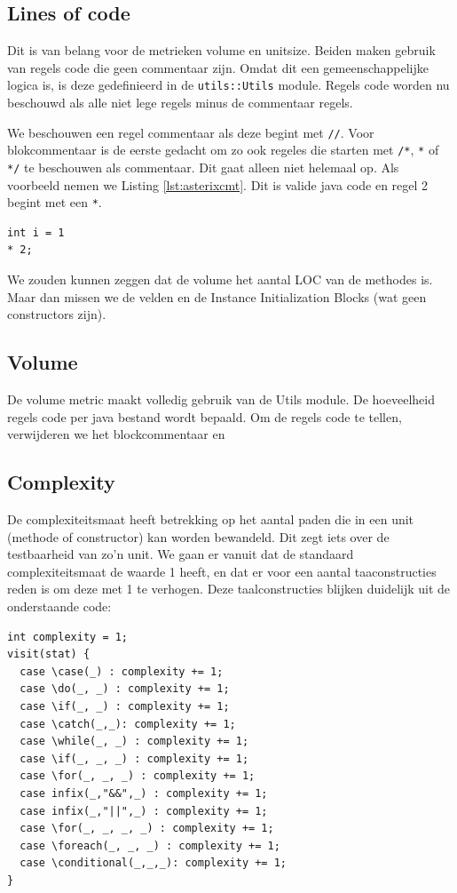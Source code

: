 \documentclass[a4paper]{article}
\begin{document}
\subsection{Lines of code}
Dit is van belang voor de metrieken volume en unitsize. Beiden
maken gebruik van regels code die geen commentaar zijn. Omdat
dit een gemeenschappelijke logica is, is deze gedefinieerd in de
\texttt{utils::Utils} module.
Regels code worden nu beschouwd als alle niet lege regels minus
de commentaar regels.

We beschouwen een regel commentaar als deze begint met
\lstinline{//}. Voor blokcommentaar is de eerste gedacht om zo
ook regeles die starten met \lstinline{/*}, \lstinline{*} of
\lstinline{*/} te beschouwen als commentaar. Dit gaat alleen
niet helemaal op. Als voorbeeld nemen we Listing
\ref{lst:asterixcmt}. Dit is valide java code en regel 2 begint
met een \lstinline{*}.

\begin{lstlisting}[caption={* als commentaar
beschouwen},label={lst:asterixcmt},escapechar=|, frame = single]
int i = 1
* 2;
\end{lstlisting}

We zouden kunnen zeggen dat de volume het aantal LOC van de
methodes is. Maar dan missen we de velden en de Instance
Initialization Blocks (wat geen constructors zijn).

\subsection{Volume}
De volume metric maakt volledig gebruik van de Utils module. De
hoeveelheid regels code per java bestand wordt bepaald. Om de
regels code te tellen, verwijderen we het blockcommentaar en

\subsection{Complexity}
De complexiteitsmaat heeft betrekking op het aantal paden die in
een unit (methode of constructor) kan worden bewandeld. Dit zegt
iets over de testbaarheid van zo'n unit. We gaan er vanuit dat
de standaard complexiteitsmaat de waarde 1 heeft, en dat er voor
een aantal taaconstructies reden is om deze met 1 te verhogen.
Deze taalconstructies blijken duidelijk uit de onderstaande
code:

\begin{lstlisting}[caption={Taalsconstructies die de
complexiteit verhogen},label={lst:complexity},escapechar=|,
frame = single]
int complexity = 1;
visit(stat) {
  case \case(_) : complexity += 1;
  case \do(_, _) : complexity += 1;
  case \if(_, _) : complexity += 1;
  case \catch(_,_): complexity += 1;
  case \while(_, _) : complexity += 1;
  case \if(_, _, _) : complexity += 1;
  case \for(_, _, _) : complexity += 1;
  case infix(_,"&&",_) : complexity += 1;
  case infix(_,"||",_) : complexity += 1;    
  case \for(_, _, _, _) : complexity += 1;
  case \foreach(_, _, _) : complexity += 1;
  case \conditional(_,_,_): complexity += 1;
}
\end{lstlisting}
\end{document}

